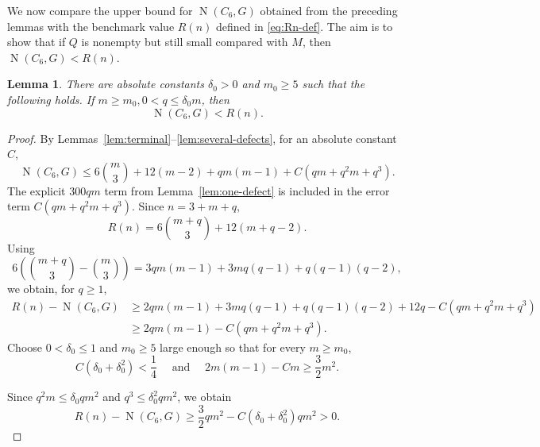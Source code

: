 \documentclass[11pt,letterpaper]{article}
\newtheorem{lemma}[theorem]{Lemma}
\newcommand{\N}{\operatorname{N}}
\begin{document}
We now compare the upper bound for \(\N(C_6,G)\) obtained from the preceding lemmas with the benchmark value \(R(n)\) defined in \eqref{eq:Rn-def}. The aim is to show that if \(Q\) is nonempty but still small compared with \(M\), then \(\N(C_6,G)<R(n)\).

\begin{lemma}\label{lem:absorption}
There are absolute constants \(\delta_0>0\) and \(m_0\ge5\) such that the following holds. If
$m\ge m_0,0<q\le\delta_0m$, 
then
\[
  \N(C_6,G)<R(n).
\]
\end{lemma}

\begin{proof}
By Lemmas~\ref{lem:terminal}--\ref{lem:several-defects}, for an absolute constant \(C\),
\[
  \N(C_6,G)
  \le6\binom m3+12(m-2)+qm(m-1)
     +C(qm+q^2m+q^3).
\]
The explicit \(300qm\) term from Lemma~\ref{lem:one-defect} is included in the error term \(C(qm+q^2m+q^3)\).
Since \(n=3+m+q\),
\[
  R(n)=6\binom{m+q}{3}+12(m+q-2).
\]
Using
\[
  6\left(\binom{m+q}{3}-\binom m3\right)
  =3qm(m-1)+3mq(q-1)+q(q-1)(q-2),
\]
we obtain, for \(q\ge1\),
\begin{align*}
  R(n)-\N(C_6,G)
  &\ge2qm(m-1)+3mq(q-1)+q(q-1)(q-2)+12q-C(qm+q^2m+q^3)\\
  &\ge2qm(m-1)-C(qm+q^2m+q^3).
\end{align*}
Choose \(0<\delta_0\le1\) and \(m_0\ge5\) large enough
so that for every $m\ge m_0$, 
\[
  C(\delta_0+\delta_0^2)<\frac14\quad\text{ and }\quad 2m(m-1)-Cm\ge\frac32m^2.
\]

Since $q^2m\le\delta_0qm^2$ and $q^3\le\delta_0^2qm^2$,
we obtain
\[
  R(n)-\N(C_6,G)
  \ge\frac32qm^2-C(\delta_0+\delta_0^2)qm^2>0.
\]
\end{proof}
\end{document}
